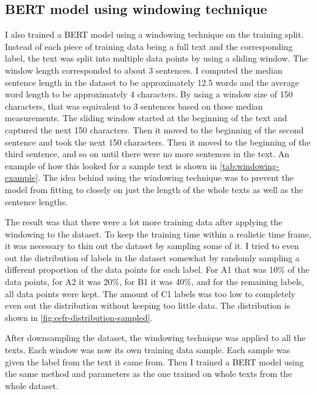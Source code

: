 \documentclass[11pt,a4paper]{article}
\begin{document}
\subsection{BERT model using windowing technique}

I also trained a BERT model using a windowing technique on the training
split. Instead of each piece of training data being a full text and the
corresponding label, the text was split into multiple data points by using a
sliding window. The window length corresponded to about 3 sentences. I computed
the median sentence length in the dataset to be approximately 12.5 words and
the average word length to be approximately 4 characters. By using a window
size of 150 characters, that was equivalent to 3 sentences based on those median
measurements. The sliding window started at the beginning of the text and
captured the next 150 characters. Then it moved to the beginning of the second
sentence and took the next 150 characters. Then it moved to the beginning of the
third sentence, and so on until there were no more sentences in the text. An
example of how this looked for a sample text is shown in
\autoref{tab:windowing-example}. The idea behind using the windowing technique
was to prevent the model from fitting to closely on just the length of the whole texts
as well as the sentence lengths.

The result was that there were a lot more training data after applying the
windowing to the dataset. To keep the training time within a realistic time frame, it was
necessary to thin out the dataset by sampling some of it. I tried to even out
the distribution of labels in the dataset somewhat by randomly sampling
a different proportion of the data points for each label. For A1 that was 10\%
of the data points, for A2 it was 20\%, for B1 it was 40\%, and for the
remaining labels, all data points were kept. The amount of C1 labels was too
low to completely even out the distribution without keeping too little
data. The distribution is shown in \autoref{fig:cefr-distribution-sampled}.

After downsampling the dataset, the windowing technique was applied to all the
texts. Each window was now its own training data sample. Each sample was given the
label from the text it came from. Then I trained a BERT model using the same method
and parameters as the one trained on whole texts from the whole dataset.
\end{document}
